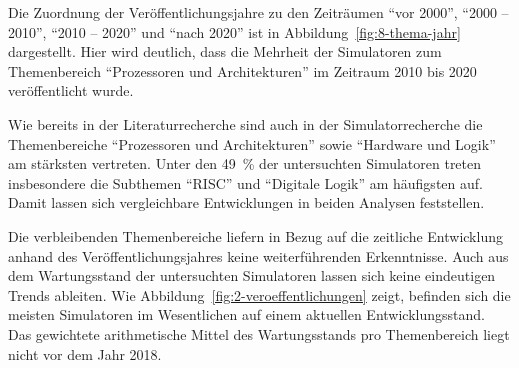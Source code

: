 Die Zuordnung der Veröffentlichungsjahre zu den Zeiträumen \enquote{vor 2000}, \enquote{2000 -- 2010}, \enquote{2010 -- 2020} und \enquote{nach 2020} ist in Abbildung~\ref{fig:8-thema-jahr} dargestellt. Hier wird deutlich, dass die Mehrheit der Simulatoren zum Themenbereich \enquote{Prozessoren und Architekturen} im Zeitraum 2010 bis 2020 veröffentlicht wurde.

Wie bereits in der Literaturrecherche sind auch in der Simulatorrecherche die Themenbereiche \enquote{Prozessoren und Architekturen} sowie \enquote{Hardware und Logik} am stärksten vertreten. Unter den 49~\% der untersuchten Simulatoren treten insbesondere die Subthemen \enquote{\acs{RISC}} und \enquote{Digitale Logik} am häufigsten auf. Damit lassen sich vergleichbare Entwicklungen in beiden Analysen feststellen.

Die verbleibenden Themenbereiche liefern in Bezug auf die zeitliche Entwicklung anhand des Veröffentlichungsjahres keine weiterführenden Erkenntnisse. Auch aus dem Wartungsstand der untersuchten Simulatoren lassen sich keine eindeutigen Trends ableiten. Wie Abbildung~\ref{fig:2-veroeffentlichungen} zeigt, befinden sich die meisten Simulatoren im Wesentlichen auf einem aktuellen Entwicklungsstand. Das gewichtete arithmetische Mittel des Wartungsstands pro Themenbereich liegt nicht vor dem Jahr 2018.


